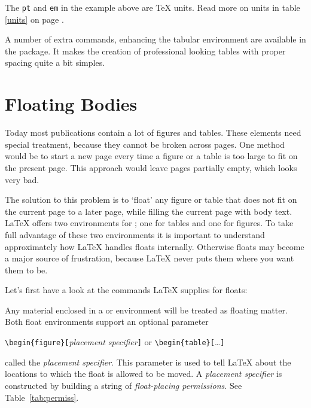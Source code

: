 The \texttt{pt} and \texttt{em} in the example above are \TeX{} units. Read more
on units in table \ref{units} on page \pageref{units}.

A number of extra commands, enhancing the tabular environment are available
in the  package. It makes the creation of professional looking
tables with proper spacing quite a bit simples.


\section{Floating Bodies}
Today most publications contain a lot of figures and tables. These
elements need special treatment, because they cannot be broken across
pages.  One method would be to start a new page every time a figure or
a table is too large to fit on the present page. This approach would
leave pages partially empty, which looks very bad.

The solution to this problem is to `float' any figure or table that
does not fit on the current page to a later page, while filling the
current page with body text. \LaTeX{} offers two environments for
; one for tables and  one for figures.  To
take full advantage of these two environments it is important to
understand approximately how \LaTeX{} handles floats internally.
Otherwise floats may become a major source of frustration, because
\LaTeX{} never puts them where you want them to be.

\bigskip
Let's first have a look at the commands \LaTeX{} supplies
for floats:

Any material enclosed in a  or  environment will
be treated as floating matter. Both float environments support an optional
parameter
\begin{lscommand}
\verb|\begin{figure}[|\emph{placement specifier}\verb|]| or
\verb|\begin{table}[|\ldots\verb|]|
\end{lscommand}
\noindent called the \emph{placement specifier}. This parameter
is used to tell \LaTeX{} about the locations to which the float
is allowed to be moved.  A \emph{placement specifier} is constructed by building a string
of \emph{float-placing permissions}. See Table~\ref{tab:permiss}.

